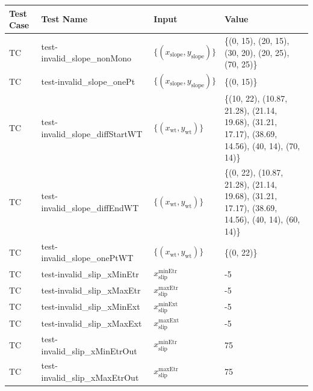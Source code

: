 \documentclass[12pt, titlepage]{article}
\newcounter{testnum} %
\begin{document}
\begin{longtable}{  l  p{5cm}  l  p{5cm}  }
	\hline
	\textbf{Test Case} & \textbf{Test Name} & \textbf{Input} & \textbf{Value} \\
	\hline
	TC{testnum}\thetestnum \label{TC_InvalidSlopeNonMonotonic} & 
	test-invalid\_slope\_nonMono & 
	$\{\left(x_\text{slope},y_\text{slope}\right)\}$ & \{(0, 15), (20, 15), 
	(30, 20), (20, 25), (70, 25)\}\\ 
	\hline
	TC{testnum}\thetestnum \label{TC_InvalidSlopeOnePt} & 
	test-invalid\_slope\_onePt & 
	$\{\left(x_\text{slope},y_\text{slope}\right)\}$ & \{(0, 15)\}\\ 
	\hline
	TC{testnum}\thetestnum \label{TC_InvalidSlopeDiffStartWT} & 
	test-invalid\_slope\_diffStartWT & 
	$\{\left(x_\text{wt},y_\text{wt}\right)\}$ & \{(10, 22), (10.87, 21.28), 
	(21.14, 
	19.68), (31.21, 17.17), (38.69, 14.56), (40, 14), (70, 14)\}\\ 
	\hline
	TC{testnum}\thetestnum \label{TC_InvalidSlopeDiffEndWT} & 
	test-invalid\_slope\_diffEndWT & 
	$\{\left(x_\text{wt},y_\text{wt}\right)\}$ & \{(0, 22), (10.87, 21.28), 
	(21.14, 
	19.68), (31.21, 17.17), (38.69, 14.56), (40, 14), (60, 14)\}\\ 
	\hline
	TC{testnum}\thetestnum \label{TC_InvalidSlopeOnePtWT} & 
	test-invalid\_slope\_onePtWT & 
	$\{\left(x_\text{wt},y_\text{wt}\right)\}$ & \{(0, 22)\}\\ 
	\hline
	TC{testnum}\thetestnum \label{TC_InvalidSlipXMinEtr} & 
	test-invalid\_slip\_xMinEtr & ${x_\text{slip}^\text{minEtr}}$ & -5\\ 
	\hline
	TC{testnum}\thetestnum \label{TC_InvalidSlipXMaxEtr} & 
	test-invalid\_slip\_xMaxEtr & ${x_\text{slip}^\text{maxEtr}}$ & -5\\ 
	\hline
	TC{testnum}\thetestnum \label{TC_InvalidSlipXMinExt} & 
	test-invalid\_slip\_xMinExt & ${x_\text{slip}^\text{minExt}}$ & -5\\ 
	\hline
	TC{testnum}\thetestnum \label{TC_InvalidSlipXMaxExt} & 
	test-invalid\_slip\_xMaxExt & ${x_\text{slip}^\text{maxExt}}$ & -5\\ 
	\hline
	TC{testnum}\thetestnum \label{TC_InvalidSlipXMinEtrOut} & 
	test-invalid\_slip\_xMinEtrOut & ${x_\text{slip}^\text{minEtr}}$ & 75\\ 
	\hline
	TC{testnum}\thetestnum \label{TC_InvalidSlipXMaxEtrOut} & 
	test-invalid\_slip\_xMaxEtrOut & ${x_\text{slip}^\text{maxEtr}}$ & 75\\ 

\end{longtable}
\end{document}
